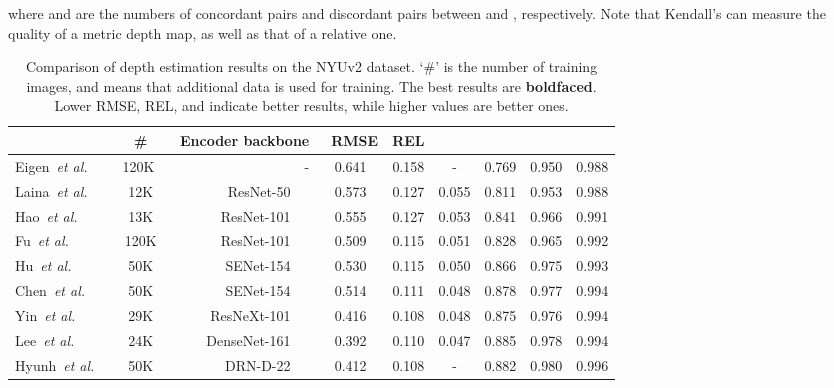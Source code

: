 \documentclass[runningheads]{llncs}
\newcommand{\etal}{\textit{et al.}}
\begin{document}
where  and  are the numbers of concordant pairs and discordant pairs between  and , respectively. Note that Kendall's  can measure the quality of a metric depth map, as well as that of a relative one.

\begin{table}[!t]
    \scriptsize
    \addtolength{\tabcolsep}{0.2pt}
    \renewcommand{\arraystretch}{1.1}
    \caption{Comparison of depth estimation results on the NYUv2 dataset. `\#' is the number of training images, and  means that additional data is used for training. The best results are \textbf{boldfaced}. Lower RMSE, REL, and  indicate better results, while higher  values are better ones.}

    \centering
    \begin{tabular}{l|c|r|cccccc}
    \toprule
    & \# & \multicolumn{1}{c|}{Encoder backbone} & \ RMSE & REL &  & \  \ & \  \ &  \  \ \\
    \midrule
    \multicolumn{1}{l|}{Eigen~\etal~\cite{eigen2014depth}} & \ 120K \ & - \hspace{1cm} & 0.641 & 0.158 & - & 0.769 & 0.950 & 0.988\\
    \multicolumn{1}{l|}{Laina~\etal~\cite{laina2016deeper}} & 12K & ResNet-50~\cite{he2016deep} \ & 0.573 & 0.127 & 0.055 & 0.811 & 0.953 & 0.988\\
    \multicolumn{1}{l|}{Hao~\etal~\cite{hao2018detail}} & 13K & ResNet-101~\cite{he2016deep} \ & 0.555 & 0.127 & 0.053 & 0.841 & 0.966 & 0.991\\
    \multicolumn{1}{l|}{Fu~\etal~\cite{fu2018deep}} & 120K & ResNet-101~\cite{he2016deep} \ & 0.509 & 0.115 & 0.051 & 0.828 & 0.965 & 0.992\\
    \multicolumn{1}{l|}{Hu~\etal~\cite{hu2019revisiting}} & 50K & SENet-154~\cite{hu2018squeeze} \ & 0.530 & 0.115 & 0.050 & 0.866 & 0.975 & 0.993\\
    \multicolumn{1}{l|}{Chen~\etal~\cite{chen2019structure}} & 50K & SENet-154~\cite{hu2018squeeze} \ & 0.514 & 0.111 & 0.048 & 0.878 & 0.977 & 0.994\\
    \multicolumn{1}{l|}{Yin~\etal~\cite{yin2019enforcing}} & 29K & ResNeXt-101~\cite{xie2017aggregated} \ & 0.416 & 0.108 & 0.048 & 0.875 & 0.976 & 0.994\\
    \multicolumn{1}{l|}{Lee~\etal~\cite{lee2019big}} & 24K & DenseNet-161~\cite{huang2017densely} \ & 0.392 & 0.110 & 0.047 & 0.885 & 0.978 & 0.994\\
    \multicolumn{1}{l|}{Hyunh~\etal~\cite{huynh2020guiding}} & 50K & DRN-D-22~\cite{yu2017dilated} \ & 0.412 & 0.108 & - & 0.882 & 0.980 & 0.996\\

\end{tabular}
\end{table}
\end{document}
